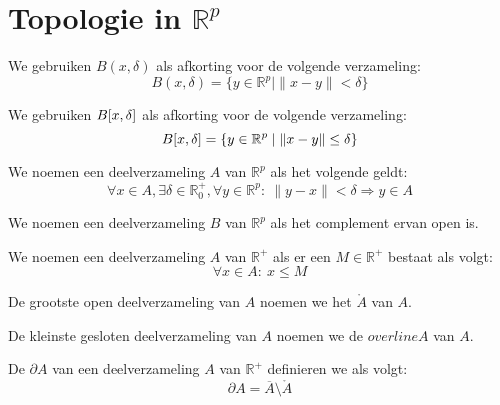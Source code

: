 \documentclass[main.tex]{subfiles}
\begin{document}
\section{Topologie in $\mathbb{R}^p$}
\label{sec:topologie-mathbbrp}

\begin{de}
  We gebruiken $B(x,\delta)$ als afkorting voor de volgende verzameling:
  \[ B(x,\delta) = \{ y \in \mathbb{R}^{p} \mid \|x-y\| < \delta \} \]
\end{de}
\begin{de}
  We gebruiken $B\interval{x}{\delta}$ als afkorting voor de volgende verzameling:
  \[ B\interval{x}{\delta} = \{ y \in \mathbb{R}^{p} \mid \|x-y\| \le \delta \} \]
\end{de}

\begin{de}
  We noemen een deelverzameling $A$ van $\mathbb{R}^{p}$  als het volgende geldt:
  \[ \forall x\in A, \exists \delta \in \mathbb{R}_{0}^{+}, \forall y\in \mathbb{R}^{p}:\ \|y-x\| < \delta \Rightarrow y \in A \]
\end{de}

\begin{de}
  We noemen een deelverzameling $B$ van $\mathbb{R}^{p}$  als het complement ervan open is.
\end{de}

\begin{de}
  We noemen een deelverzameling $A$ van $\mathbb{R}^{+}$  als er een $M \in \mathbb{R}^{+}$ bestaat als volgt:
  \[ \forall x \in A:\ x \le M \]
\end{de}


\begin{de}
  De grootste open deelverzameling van $A$ noemen we het  $\mathring{A}$ van $A$.
\end{de}

\begin{de}
  De kleinste gesloten deelverzameling van $A$ noemen we de  $overline{A}$ van $A$.
\end{de}


\begin{de}
  De  $\partial A$ van een deelverzameling $A$ van $\mathbb{R}^{+}$ definieren we als volgt:
  \[ \partial A = \overline{A} \setminus \mathring{A} \]
\end{de}
\end{document}
